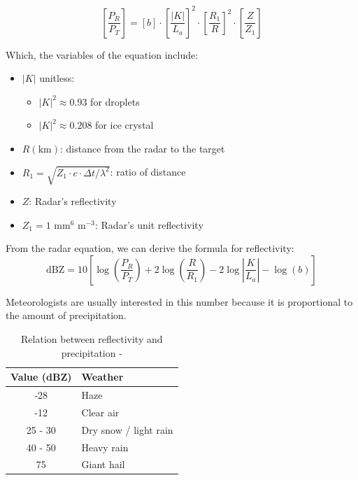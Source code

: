 \[
    \left[ \frac{P_R}{P_T} \right]=\left[ b \right]\cdot\left[ \frac{|K|}{L_a} \right]^2\cdot\left[ \frac{R_1}{R} \right]^2\cdot\left[ \frac{Z}{Z_1} \right]
\]
\vspace{0.5cm}

Which, the variables of the equation include:
\begin{itemize}
    \item $|K|$ unitless:
          \begin{itemize}
              \item $|K|^2 \approx 0.93$ for droplets
              \item $|K|^2 \approx 0.208$ for ice crystal
          \end{itemize}
    \item $R (\text{km})$: distance from the radar to the target
    \item $R_1 = \sqrt{Z_1 \cdot c \cdot \Delta t / \lambda^2}$: ratio of
    distance
    \item $Z$: Radar's reflectivity
    \item $Z_1 = 1 \text{ mm}^6 \text{ m}^{-3}$: Radar's unit reflectivity
\end{itemize}

From the radar equation, we can derive the formula for reflectivity:
\vspace{0.5cm}
\[
    \text{dBZ} = 10\left[ \log\left( \frac{P_R}{P_T} \right) + 2 \log\left( \frac{R}{R_1} \right) - 2\log\left| \frac{K}{L_a} \right| - \log\left( b \right) \right]
\]

Meteorologists are usually interested in this number because it is proportional
to the amount of precipitation.

\begin{table}[h]
    \centering
    \begin{tabular}{|c|l|}
        \hline
        Value (dBZ) & Weather               \\
        \hline
        -28         & Haze                  \\
        -12         & Clear air             \\
        25 - 30     & Dry snow / light rain \\
        40 - 50     & Heavy rain            \\
        75          & Giant hail            \\
        \hline
    \end{tabular}
    \vspace{1em}
    \caption{ Relation between reflectivity and precipitation -
    \citet{2022Weather}}
\end{table}

